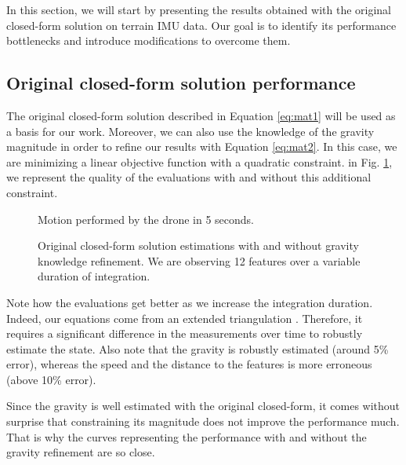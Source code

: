 \documentclass[letterpaper, 10 pt, conference]{ieeeconf}  %
\begin{document}
In this section, we will start by presenting the results obtained with the original closed-form solution on terrain IMU data.
Our goal is to identify its performance bottlenecks and introduce modifications to overcome them.


\subsection{Original closed-form solution performance}

The original closed-form solution described in Equation \ref{eq:mat1} will be used as a basis for our work.
Moreover, we can also use the knowledge of the gravity magnitude in order to refine our results with Equation \ref{eq:mat2}.
In this case, we are minimizing a linear objective function with a quadratic constraint.
in Fig. \ref{fig:original}, we represent the quality of the evaluations with and without this additional constraint.


\begin{figure}
  \centering
    \resizebox{0.6\columnwidth}{!}{}
    \caption{Motion performed by the drone in 5 seconds.}
\end{figure}

\begin{figure}
  \centering
    \resizebox{0.7\columnwidth}{!}{}
    \caption{Original closed-form solution estimations with and without gravity knowledge refinement. We are observing 12 features  over a variable duration of integration.\label{fig:original}}
\end{figure}


Note how the evaluations get better as we increase the integration duration.
Indeed, our equations come from an extended triangulation \cite{Martinelli2012}.
Therefore, it requires a significant difference in the measurements over time to robustly estimate the state.
Also note that the gravity is robustly estimated (around 5\% error), whereas the speed and the distance to the features is more erroneous (above 10\% error).

Since the gravity is well estimated with the original closed-form, it comes without surprise that constraining its magnitude does not improve the performance much.
That is why the curves representing the performance with and without the gravity refinement are so close.
\end{document}
